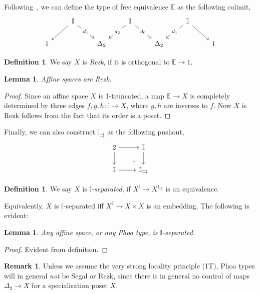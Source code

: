 \documentclass[12pt]{amsart}
\newtheorem{lemma}[theorem]{Lemma}
\theoremstyle{definition}
\newtheorem{definition}[theorem]{Definition}
\newtheorem{remark}[theorem]{Remark}
\newcommand{\mbb}[1]{\mathbb{#1}}
\newcommand{\I}{\mbb I}
\begin{document}
 

Following~\cite{buchholtz2021synthetic}, we can define the type of free equivalence $\mbb E$ as the following colimit,
\[
\begin{tikzcd}
	& \I && \I && \I \\
	1 && {\Delta_2} && {\Delta_2} && 1
	\arrow[from=1-2, to=2-1]
	\arrow["{d_1}"{description}, from=1-2, to=2-3]
	\arrow["{d_2}"{description}, from=1-4, to=2-3]
	\arrow["{d_0}"{description}, from=1-4, to=2-5]
	\arrow["{d_1}"{description}, from=1-6, to=2-5]
	\arrow[from=1-6, to=2-7]
\end{tikzcd}
\]

\begin{definition}
  We say $X$ is \emph{Rezk}, if it is orthogonal to $\mbb E \to 1$.
\end{definition}

\begin{lemma}
  Affine spaces are Rezk.
\end{lemma}
\begin{proof}
  Since an affine space $X$ is 1-truncated, a map $\mbb E \to X$ is completely determined by three edges $f,g,h : \I \to X$, where $g,h$ are inverses to $f$. Now $X$ is Rezk follows from the fact that its order is a poset.
\end{proof}

Finally, we can also construct $\I_{\rightrightarrows}$ as the following pushout,
\[
\begin{tikzcd}
  2 \ar[r] \ar[d] & \I \ar[d] \\ 
  \I \ar[r] & \I_{\rightrightarrows}
  \arrow["\lrcorner"{anchor=center, pos=0.125, rotate=180}, draw=none, from=2-2, to=1-1]
\end{tikzcd}
\]

\begin{definition}
  We say $X$ is \emph{$\I$-separated}, if $X^{\I} \to X^{\I_\rightrightarrows}$ is an equivalence.
\end{definition}

Equivalently, $X$ is $\I$-separated iff $X^\I \to X \times X$ is an embedding. The following is evident:

\begin{lemma}
  Any affine space, or any Phoa type, is $\I$-separated.
\end{lemma}
\begin{proof}
  Evident from definition.
\end{proof}

\begin{remark}
  Unless we assume the very strong locality principle (1T), Phoa types will in general \emph{not} be Segal or Rezk, since there is in general no control of maps $\Delta_2 \to X$ for a specialisation poset $X$.
\end{remark}
\end{document}
